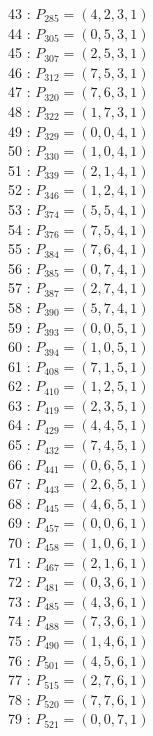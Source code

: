 \documentclass{article}
\begin{document}
{\begin{multicols}{3}
43 : $P_{285}=( 4, 2, 3, 1 )$\\
44 : $P_{305}=( 0, 5, 3, 1 )$\\
45 : $P_{307}=( 2, 5, 3, 1 )$\\
46 : $P_{312}=( 7, 5, 3, 1 )$\\
47 : $P_{320}=( 7, 6, 3, 1 )$\\
48 : $P_{322}=( 1, 7, 3, 1 )$\\
49 : $P_{329}=( 0, 0, 4, 1 )$\\
50 : $P_{330}=( 1, 0, 4, 1 )$\\
51 : $P_{339}=( 2, 1, 4, 1 )$\\
52 : $P_{346}=( 1, 2, 4, 1 )$\\
53 : $P_{374}=( 5, 5, 4, 1 )$\\
54 : $P_{376}=( 7, 5, 4, 1 )$\\
55 : $P_{384}=( 7, 6, 4, 1 )$\\
56 : $P_{385}=( 0, 7, 4, 1 )$\\
57 : $P_{387}=( 2, 7, 4, 1 )$\\
58 : $P_{390}=( 5, 7, 4, 1 )$\\
59 : $P_{393}=( 0, 0, 5, 1 )$\\
60 : $P_{394}=( 1, 0, 5, 1 )$\\
61 : $P_{408}=( 7, 1, 5, 1 )$\\
62 : $P_{410}=( 1, 2, 5, 1 )$\\
63 : $P_{419}=( 2, 3, 5, 1 )$\\
64 : $P_{429}=( 4, 4, 5, 1 )$\\
65 : $P_{432}=( 7, 4, 5, 1 )$\\
66 : $P_{441}=( 0, 6, 5, 1 )$\\
67 : $P_{443}=( 2, 6, 5, 1 )$\\
68 : $P_{445}=( 4, 6, 5, 1 )$\\
69 : $P_{457}=( 0, 0, 6, 1 )$\\
70 : $P_{458}=( 1, 0, 6, 1 )$\\
71 : $P_{467}=( 2, 1, 6, 1 )$\\
72 : $P_{481}=( 0, 3, 6, 1 )$\\
73 : $P_{485}=( 4, 3, 6, 1 )$\\
74 : $P_{488}=( 7, 3, 6, 1 )$\\
75 : $P_{490}=( 1, 4, 6, 1 )$\\
76 : $P_{501}=( 4, 5, 6, 1 )$\\
77 : $P_{515}=( 2, 7, 6, 1 )$\\
78 : $P_{520}=( 7, 7, 6, 1 )$\\
79 : $P_{521}=( 0, 0, 7, 1 )$\\

\end{multicols}}
\end{document}
